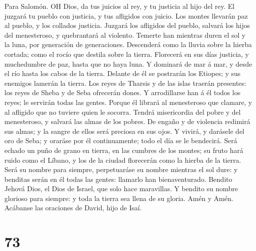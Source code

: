  Para Salomón. OH Dios, da tus juicios al rey, y tu justicia
al hijo del rey.  El juzgará tu pueblo con justicia, y tus
afligidos con juicio.  Los montes llevarán paz al pueblo, y
los collados justicia.  Juzgará los afligidos del pueblo,
salvará los hijos del menesteroso, y quebrantará al violento.
 Temerte han mientras duren el sol y la luna, por generación
de generaciones.  Descenderá como la lluvia sobre la hierba
cortada; como el rocío que destila sobre la tierra. 
Florecerá en sus días justicia, y muchedumbre de paz, hasta que no haya
luna.  Y dominará de mar á mar, y desde el río hasta los
cabos de la tierra.  Delante de él se postrarán los Etiopes;
y sus enemigos lamerán la tierra.  Los reyes de Tharsis y
de las islas traerán presentes: los reyes de Sheba y de Seba ofrecerán
dones.  Y arrodillarse han á él todos los reyes; le
servirán todas las gentes.  Porque él librará al
menesteroso que clamare, y al afligido que no tuviere quien le socorra.
 Tendrá misericordia del pobre y del menesteroso, y salvará
las almas de los pobres.  De engaño y de violencia redimirá
sus almas; y la sangre de ellos será preciosa en sus ojos. 
Y vivirá, y darásele del oro de Seba; y oraráse por él continuamente;
todo el día se le bendecirá.  Será echado un puño de grano
en tierra, en las cumbres de los montes; su fruto hará ruido como el
Líbano, y los de la ciudad florecerán como la hierba de la tierra.
 Será su nombre para siempre, perpetuaráse su nombre
mientras el sol dure: y benditas serán en él todas las gentes: llamarlo
han bienaventurado.  Bendito Jehová Dios, el Dios de
Israel, que solo hace maravillas.  Y bendito su nombre
glorioso para siempre: y toda la tierra sea llena de su gloria. Amén y
Amén.  Acábanse las oraciones de David, hijo de Isaí.

\hypertarget{section-72}{%
\section{73}\label{section-72}}

